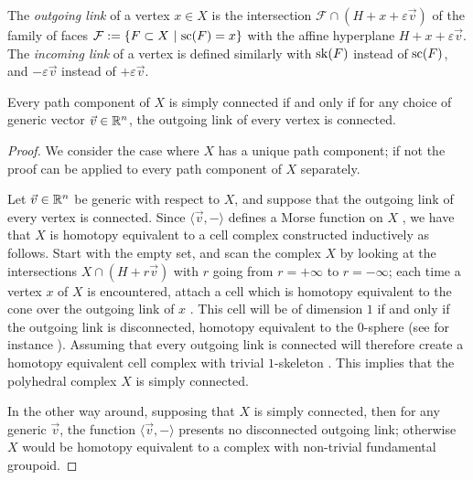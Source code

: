 \begin{definition}
    The \emph{outgoing link} of a vertex $x \in X$ is the intersection $\mathcal{F} \cap (H+x+\varepsilon \vec v)$ of the family of faces $\mathcal{F}:=\{ F \subset X \ | \ \mathrm{sc}(F)=x \}$ with the affine hyperplane $H+x+\varepsilon \vec v$.
    The \emph{incoming link} of a vertex is defined similarly with $\mathrm{sk}(F)$ instead of $\mathrm{sc}(F)$, and $-\varepsilon \vec v$ instead of $+ \varepsilon \vec v$. 
\end{definition}

\begin{lemma}
    \label{lemma:outgoing-link}
    Every path component of $X$ is simply connected if and only if for any choice of generic vector $\vec v \in \mathbb R^n$, the outgoing link of every vertex is connected. 
\end{lemma}

\begin{proof}
    We consider the case where $X$ has a unique path component; if not the proof can be applied to every path component of $X$ separately. 

    Let $\vec v \in \mathbb R^n$ be generic with respect to $X$, and suppose that the outgoing link of every vertex is connected. 
    Since $\langle \vec v , -\rangle$ defines a Morse function on $X$ \cite[Definition 2.2]{bestvinaMorseTheoryFiniteness1997}, we have that $X$
    is homotopy equivalent to a cell complex constructed inductively as follows.
    Start with the empty set, and scan the complex $X$ by looking at the intersections $X \cap (H+r\vec v)$ with $r$ going from $r=+\infty$ to $r=-\infty$; each time a vertex $x$ of $X$ is encountered, attach a cell which is homotopy equivalent to the cone over the outgoing link of $x$ \cite[Lemma 2.5]{bestvinaMorseTheoryFiniteness1997}.
    This cell will be of dimension $1$ if and only if the outgoing link is disconnected, homotopy equivalent to the $0$-sphere (see for instance \cite[Lemma 4.5]{grunertPLMorseTheory2019}). 
    Assuming that every outgoing link is connected will therefore create a homotopy equivalent cell complex with trivial $1$-skeleton \cite[Point (3) of Corollary 2.6]{bestvinaMorseTheoryFiniteness1997}.
    This implies that the polyhedral complex $X$ is simply connected.
    
    In the other way around, supposing that $X$ is simply connected, then for any generic $\vec v$, the function $\langle \vec v , -\rangle$ presents no disconnected outgoing link; otherwise $X$ would be homotopy equivalent to a complex with non-trivial fundamental groupoid. 
\end{proof}

